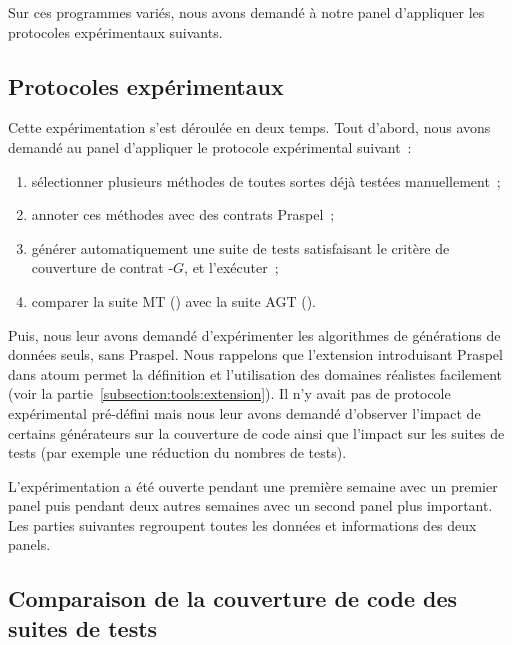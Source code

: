Sur ces programmes variés, nous avons demandé à notre panel d'appliquer les
protocoles expérimentaux suivants.

\subsection{Protocoles expérimentaux}

Cette expérimentation s'est déroulée en deux temps. Tout d'abord, nous avons
demandé au panel d'appliquer le protocole expérimental suivant~:
%
\begin{enumerate}

\item sélectionner plusieurs méthodes de toutes sortes déjà testées
manuellement~;

\item annoter ces méthodes avec des contrats Praspel~;

\item générer automatiquement une suite de tests satisfaisant le critère de
couverture de contrat -$G$, et l'exécuter~;

\item comparer la suite MT () avec la suite AGT
().

\end{enumerate}

Puis, nous leur avons demandé d'expérimenter les algorithmes de générations de
données seuls, sans Praspel. Nous rappelons que l'extension introduisant Praspel
dans atoum permet la définition et l'utilisation des domaines réalistes
facilement (voir la partie~\ref{subsection:tools:extension}). Il n'y avait pas
de protocole expérimental pré-défini mais nous leur avons demandé d'observer
l'impact de certains générateurs sur la couverture de code ainsi que l'impact
sur les suites de tests (par exemple une réduction du nombres de tests).

L'expérimentation a été ouverte pendant une première semaine avec un premier
panel puis pendant deux autres semaines avec un second panel plus important. Les
parties suivantes regroupent toutes les données et informations des deux panels.


\subsection{Comparaison de la couverture de code des suites de tests}


